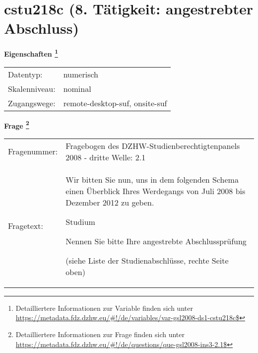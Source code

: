 
    \setcounter{footnote}{0}

    \vspace*{-1.8cm}
	\section{cstu218c (8. Tätigkeit: angestrebter Abschluss)}
	\label{section:cstu218c}



    \vspace*{0.5cm}
    \noindent\textbf{Eigenschaften
	\footnote{Detailliertere Informationen zur Variable finden sich unter
		\url{https://metadata.fdz.dzhw.eu/\#!/de/variables/var-gsl2008-ds1-cstu218c$}}}\\
	\begin{tabularx}{\hsize}{@{}lX}
	Datentyp: & numerisch \\
	Skalenniveau: & nominal \\
	Zugangswege: &
	  remote-desktop-suf, 
	  onsite-suf
 \\
    \end{tabularx}



				\vspace*{0.5cm}
                \noindent\textbf{Frage
	                \footnote{Detailliertere Informationen zur Frage finden sich unter
		              \url{https://metadata.fdz.dzhw.eu/\#!/de/questions/que-gsl2008-ins3-2.1$}}}\\
				\begin{tabularx}{\hsize}{@{}lX}
					Fragenummer: &
					  Fragebogen des DZHW-Studienberechtigtenpanels 2008 - dritte Welle:
					  2.1
 \\
					Fragetext: & Wir bitten Sie nun, uns in dem folgenden Schema einen Überblick Ihres Werdegangs von Juli 2008 bis Dezember 2012 zu geben.\par  Studium\par  Nennen Sie bitte Ihre angestrebte Abschlussprüfung \par  (siehe Liste der Studienabschlüsse, rechte Seite oben) \\
				\end{tabularx}





